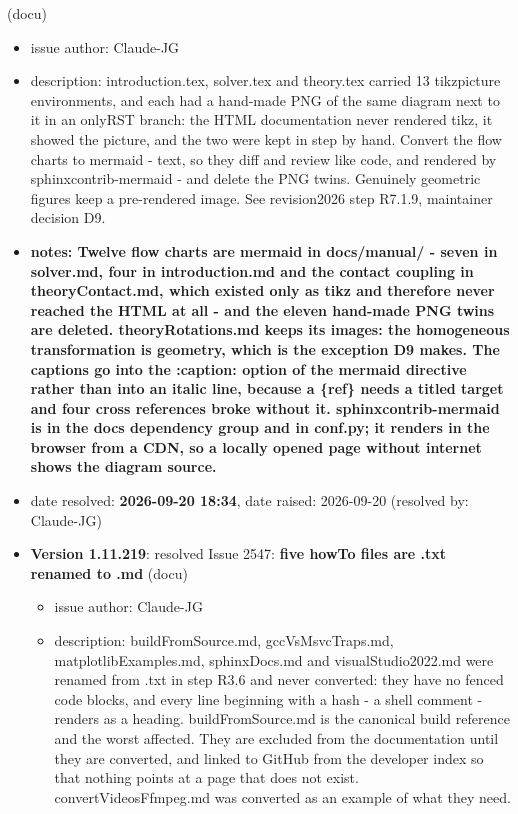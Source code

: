 \begin{itemize}
(docu)
\vspace{-6pt}   \begin{itemize} \setlength\itemsep{-1pt}
    \item issue author: Claude-JG
    \item {description: introduction.tex, solver.tex and theory.tex carried 13 tikzpicture environments, and each had a hand-made PNG of the same diagram next to it in an onlyRST branch: the HTML documentation never rendered tikz, it showed the picture, and the two were kept in step by hand. Convert the flow charts to mermaid - text, so they diff and review like code, and rendered by sphinxcontrib-mermaid - and delete the PNG twins. Genuinely geometric figures keep a pre-rendered image. See revision2026 step R7.1.9, maintainer decision D9.}
    \item {\bf notes: Twelve flow charts are mermaid in docs/manual/ - seven in solver.md, four in introduction.md and the contact coupling in theoryContact.md, which existed only as tikz and therefore never reached the HTML at all - and the eleven hand-made PNG twins are deleted. theoryRotations.md keeps its images: the homogeneous transformation is geometry, which is the exception D9 makes. The captions go into the :caption: option of the mermaid directive rather than into an italic line, because a \{ref\} needs a titled target and four cross references broke without it. sphinxcontrib-mermaid is in the docs dependency group and in conf.py; it renders in the browser from a CDN, so a locally opened page without internet shows the diagram source.}
    \item   date resolved: {\bf 2026-09-20 18:34},
date raised: 2026-09-20 (resolved by: Claude-JG)
  \ei
  \item[] {\bf Version 1.11.219}:  resolved Issue 2547: {\bf five howTo files are .txt renamed to .md}
(docu)
\vspace{-6pt}   \begin{itemize} \setlength\itemsep{-1pt}
    \item issue author: Claude-JG
    \item {description: buildFromSource.md, gccVsMsvcTraps.md, matplotlibExamples.md, sphinxDocs.md and visualStudio2022.md were renamed from .txt in step R3.6 and never converted: they have no fenced code blocks, and every line beginning with a hash - a shell comment - renders as a heading. buildFromSource.md is the canonical build reference and the worst affected. They are excluded from the documentation until they are converted, and linked to GitHub from the developer index so that nothing points at a page that does not exist. convertVideosFfmpeg.md was converted as an example of what they need.}

\end{itemize}
\end{itemize}
\end{itemize}
